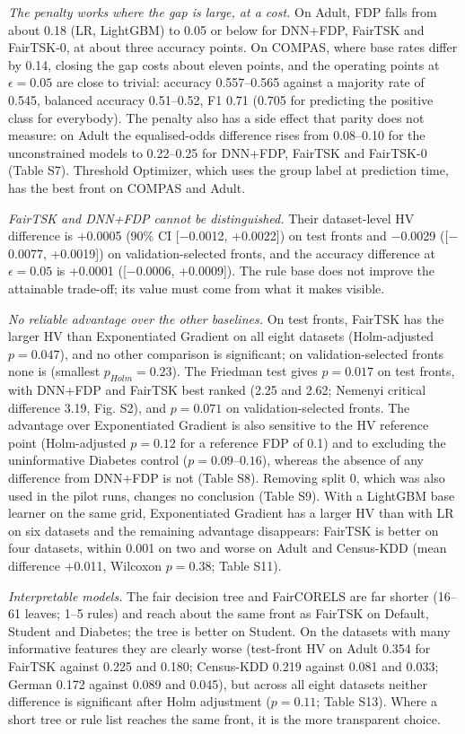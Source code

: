 \documentclass[pdflatex,sn-basic,Numbered,lineno]{sn-jnl}
\begin{document}
\emph{The penalty works where the gap is large, at a cost.} On Adult, FDP falls from about 0.18 (LR, LightGBM) to 0.05 or below for DNN+FDP, FairTSK and FairTSK-0, at about three accuracy points. On COMPAS, where base rates differ by 0.14, closing the gap costs about eleven points, and the operating points at \(\epsilon = 0.05\) are close to trivial: accuracy 0.557--0.565 against a majority rate of 0.545, balanced accuracy 0.51--0.52, F1 0.71 (0.705 for predicting the positive class for everybody). The penalty also has a side effect that parity does not measure: on Adult the equalised-odds difference rises from 0.08--0.10 for the unconstrained models to 0.22--0.25 for DNN+FDP, FairTSK and FairTSK-0 (Table S7). Threshold Optimizer, which uses the group label at prediction time, has the best front on COMPAS and Adult.

\emph{FairTSK and DNN+FDP cannot be distinguished.} Their dataset-level HV difference is +0.0005 (90\% CI {[}\ensuremath{-}0.0012, +0.0022{]}) on test fronts and \ensuremath{-}0.0029 ({[}\ensuremath{-}0.0077, +0.0019{]}) on validation-selected fronts, and the accuracy difference at \(\epsilon = 0.05\) is +0.0001 ({[}\ensuremath{-}0.0006, +0.0009{]}). The rule base does not improve the attainable trade-off; its value must come from what it makes visible.

\emph{No reliable advantage over the other baselines.} On test fronts, FairTSK has the larger HV than Exponentiated Gradient on all eight datasets (Holm-adjusted \(p = 0.047\)), and no other comparison is significant; on validation-selected fronts none is (smallest \(p_{Holm} = 0.23\)). The Friedman test gives \(p = 0.017\) on test fronts, with DNN+FDP and FairTSK best ranked (2.25 and 2.62; Nemenyi critical difference 3.19, Fig. S2), and \(p = 0.071\) on validation-selected fronts. The advantage over Exponentiated Gradient is also sensitive to the HV reference point (Holm-adjusted \(p = 0.12\) for a reference FDP of 0.1) and to excluding the uninformative Diabetes control (\(p = 0.09\)--\(0.16\)), whereas the absence of any difference from DNN+FDP is not (Table S8). Removing split 0, which was also used in the pilot runs, changes no conclusion (Table S9). With a LightGBM base learner on the same grid, Exponentiated Gradient has a larger HV than with LR on six datasets and the remaining advantage disappears: FairTSK is better on four datasets, within 0.001 on two and worse on Adult and Census-KDD (mean difference +0.011, Wilcoxon \(p = 0.38\); Table S11).

\emph{Interpretable models.} The fair decision tree and FairCORELS are far shorter (16--61 leaves; 1--5 rules) and reach about the same front as FairTSK on Default, Student and Diabetes; the tree is better on Student. On the datasets with many informative features they are clearly worse (test-front HV on Adult 0.354 for FairTSK against 0.225 and 0.180; Census-KDD 0.219 against 0.081 and 0.033; German 0.172 against 0.089 and 0.045), but across all eight datasets neither difference is significant after Holm adjustment (\(p = 0.11\); Table S13). Where a short tree or rule list reaches the same front, it is the more transparent choice.
\end{document}
